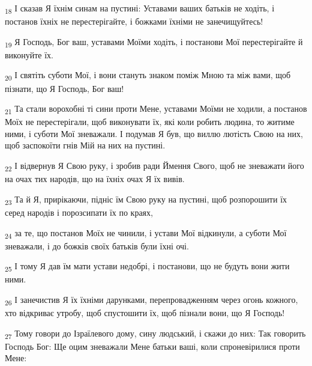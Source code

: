 \begin{tcolorbox}
\textsubscript{18} І сказав Я їхнім синам на пустині: Уставами ваших батьків не ходіть, і постанов їхніх не перестерігайте, і божками їхніми не занечищуйтесь!
\end{tcolorbox}
\begin{tcolorbox}
\textsubscript{19} Я Господь, Бог ваш, уставами Моїми ходіть, і постанови Мої перестерігайте й виконуйте їх.
\end{tcolorbox}
\begin{tcolorbox}
\textsubscript{20} І святіть суботи Мої, і вони стануть знаком поміж Мною та між вами, щоб пізнати, що Я Господь, Бог ваш!
\end{tcolorbox}
\begin{tcolorbox}
\textsubscript{21} Та стали ворохобні ті сини проти Мене, уставами Моїми не ходили, а постанов Моїх не перестерігали, щоб виконувати їх, які коли робить людина, то житиме ними, і суботи Мої зневажали. І подумав Я був, що виллю лютість Свою на них, щоб заспокоїти гнів Мій на них на пустині.
\end{tcolorbox}
\begin{tcolorbox}
\textsubscript{22} І відвернув Я Свою руку, і зробив ради Ймення Свого, щоб не зневажати його на очах тих народів, що на їхніх очах Я їх вивів.
\end{tcolorbox}
\begin{tcolorbox}
\textsubscript{23} Та й Я, прирікаючи, підніс їм Свою руку на пустині, щоб розпорошити їх серед народів і порозсипати їх по краях,
\end{tcolorbox}
\begin{tcolorbox}
\textsubscript{24} за те, що постанов Моїх не чинили, і устави Мої відкинули, а суботи Мої зневажали, і до божків своїх батьків були їхні очі.
\end{tcolorbox}
\begin{tcolorbox}
\textsubscript{25} І тому Я дав їм мати устави недобрі, і постанови, що не будуть вони жити ними.
\end{tcolorbox}
\begin{tcolorbox}
\textsubscript{26} І занечистив Я їх їхніми дарунками, перепровадженням через огонь кожного, хто відкриває утробу, щоб спустошити їх, щоб пізнали вони, що Я Господь!
\end{tcolorbox}
\begin{tcolorbox}
\textsubscript{27} Тому говори до Ізраїлевого дому, сину людський, і скажи до них: Так говорить Господь Бог: Ще оцим зневажали Мене батьки ваші, коли спроневірилися проти Мене:
\end{tcolorbox}
